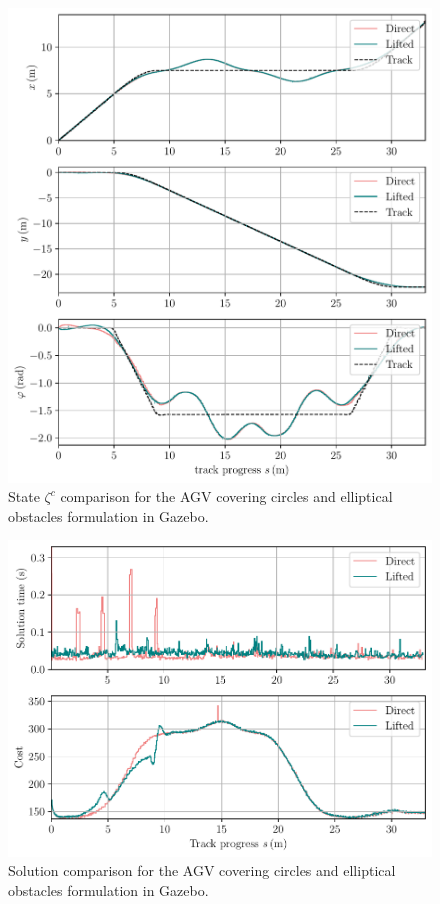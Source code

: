 \begin{figure}[h!tb]
    \includegraphics[width=1\textwidth]{figures/experiments/zeta_c}
    \caption{State $\zeta^{c}$ comparison for the \ac{AGV} covering circles and elliptical obstacles formulation in Gazebo.}  \label{fig_comp_zeta_c}
\end{figure}

\begin{figure}[h!tb]
    \includegraphics[width=1\textwidth]{figures/experiments/metrics}
    \caption{Solution comparison for the \ac{AGV} covering circles and elliptical obstacles formulation in Gazebo.}  \label{fig_metrics}
\end{figure}

